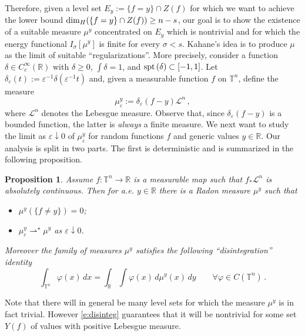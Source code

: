 \documentclass[11pt,reqno]{amsart}
\newtheorem{proposition}[theorem]{Proposition}
\theoremstyle{definition}
\numberwithin{equation}{section}
\begin{document}
Therefore, given a level set $E_y := \{f=y\}\cap Z(f)$ for which we want to achieve the lower bound ${\rm dim}_H (\{f=y\}\cap Z(f))\geq n-s$, our goal is to show the existence of a suitable measure $\mu^y$ concentrated on $E_y$ which is nontrivial and for which the energy functional $I_\sigma [\mu^y]$ is finite for every $\sigma <s$. Kahane's idea is to produce $\mu$ as the limit of suitable ``regularizations''. More precisely, consider a function $\delta \in C^\infty_c (\mathbb R)$ with $\delta \geq 0$, $\int \delta =1$, and ${\rm spt}\, (\delta) \subset [-1,1]$. Let $\delta_\varepsilon (t) := \varepsilon^{-1} \delta (\varepsilon^{-1} t)$ and, given a measurable function $f$ on $\mathbb T^n$, define the measure
\begin{equation}\label{e:approx-mu}
\mu^y_\varepsilon := \delta_\varepsilon (f-y) \mathcal{L}^n\, ,
\end{equation}
where $\mathcal{L}^n$ denotes the Lebesgue measure. 
Observe that, since $\delta_\varepsilon (f-y)$ is a bounded function, the latter is {\em always} a finite measure. We next want to study the limit as $\varepsilon\downarrow 0$ of $\mu^y_\varepsilon$ for random functions $f$ and generic values $y\in \mathbb R$. Our analysis is split in two parts. The first is deterministic and is summarized in the following proposition.

\begin{proposition}\label{p:convergence-det}
Assume $f: \mathbb T^n \to \mathbb R$ is a measurable map such that $f_* \mathcal{L}^n$ is absolutely continuous. Then for a.e. $y\in \mathbb R$ there is a Radon measure $\mu^y$ such that
\begin{itemize}
\item[(i)] $\mu^y (\{f\neq y\})=0$; 
\item[(ii)] $\mu^y_\varepsilon \rightharpoonup^\star \mu^y$ as $\varepsilon\downarrow 0$.
\end{itemize}
Moreover the family of measures $\mu^y$ satisfies the following ``disintegration'' identity
\begin{equation}\label{e:disinteg}
\int_{\mathbb T^n} \varphi (x)\, dx = \int_{\mathbb R} \int \varphi (x) \, d\mu^y (x)\, dy
\qquad \forall \varphi \in C( \mathbb T^n)\, .
\end{equation}
\end{proposition}

Note that there will in general be many level sets for which the measure $\mu^y$ is in fact trivial. However \eqref{e:disinteg} guarantees that it will be nontrivial for some set $Y(f)$ of values with positive Lebesgue measure. 
\end{document}
